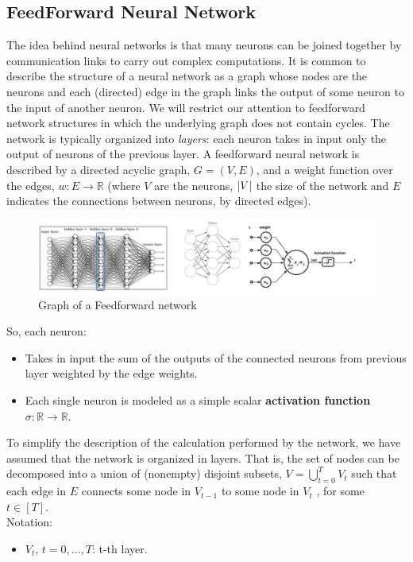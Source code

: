 \documentclass[12pt]{report}
\theoremstyle{plain}
\begin{document}
\begin{flushleft}
\section{FeedForward Neural Network}
The idea behind neural networks is that many neurons can be joined together by communication links to carry out complex computations. It is common to describe the structure of a neural network as a graph whose nodes are the neurons and each (directed) edge in the graph links the output of some neuron to the input of another neuron. We will restrict our attention to feedforward network structures in which the underlying graph does not contain cycles. The network is typically organized into \textit{layers}: each neuron takes in input only the output of neurons of the previous layer. A feedforward neural network is described by a directed acyclic graph, $G =(V, E)$, and a weight function over the edges, $w:E\to\mathds{R}$ (where $V$ are the neurons, $\abs{V}$ the size of the network and $E$ indicates the connections between neurons, by directed edges).\\
\begin{figure}[!h]
	\centering
	\includegraphics[scale=0.7]{images/feedforward_NN.pdf}
	\caption{Graph of a Feedforward network}
	\label{fig:feedforward_NN}
\end{figure}
So, each neuron:
\begin{itemize}
	\item Takes in input the sum of the outputs of the connected neurons from previous layer weighted by the	edge weights.
	\item Each single neuron is modeled as a simple scalar \textbf{activation function} $\sigma : \mathds{R}\to\mathds{R}$.
\end{itemize}
To simplify the description of the calculation performed by the network, we have assumed that the network is organized in layers. That is, the set of nodes can be decomposed into a union of (nonempty) disjoint subsets, $V=\bigcup_{t=0}^T V_t$ such that each edge in $E$ connects some node in $V_{t-1}$ to some node in $V_t$ , for some $t\in[T]$.\\
Notation:
\begin{itemize}
	\item $V_t$, $t=0,\dots,T$: t-th layer.

\end{itemize}
\end{flushleft}
\end{document}
